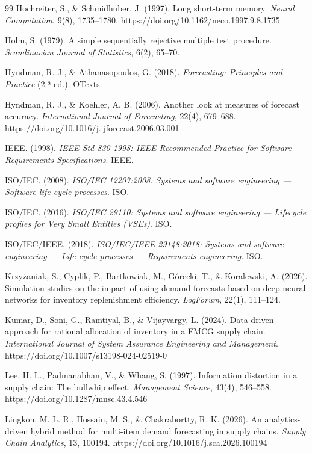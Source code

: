 \begin{thebibliography}{99}
 Hochreiter, S., \& Schmidhuber, J. (1997). Long short-term memory. \textit{Neural Computation}, 9(8), 1735--1780. https://doi.org/10.1162/neco.1997.9.8.1735

 Holm, S. (1979). A simple sequentially rejective multiple test procedure. \textit{Scandinavian Journal of Statistics}, 6(2), 65--70.

 Hyndman, R. J., \& Athanasopoulos, G. (2018). \textit{Forecasting: Principles and Practice} (2.ª ed.). OTexts.

 Hyndman, R. J., \& Koehler, A. B. (2006). Another look at measures of forecast accuracy. \textit{International Journal of Forecasting}, 22(4), 679--688. https://doi.org/10.1016/j.ijforecast.2006.03.001

 IEEE. (1998). \textit{IEEE Std 830-1998: IEEE Recommended Practice for Software Requirements Specifications}. IEEE.

 ISO/IEC. (2008). \textit{ISO/IEC 12207:2008: Systems and software engineering --- Software life cycle processes}. ISO.

 ISO/IEC. (2016). \textit{ISO/IEC 29110: Systems and software engineering --- Lifecycle profiles for Very Small Entities (VSEs)}. ISO.

 ISO/IEC/IEEE. (2018). \textit{ISO/IEC/IEEE 29148:2018: Systems and software engineering --- Life cycle processes --- Requirements engineering}. ISO.

 Krzyżaniak, S., Cyplik, P., Bartkowiak, M., Górecki, T., \& Koralewski, A. (2026). Simulation studies on the impact of using demand forecasts based on deep neural networks for inventory replenishment efficiency. \textit{LogForum}, 22(1), 111--124.

 Kumar, D., Soni, G., Ramtiyal, B., \& Vijayvargy, L. (2024). Data-driven approach for rational allocation of inventory in a FMCG supply chain. \textit{International Journal of System Assurance Engineering and Management}. https://doi.org/10.1007/s13198-024-02519-0

 Lee, H. L., Padmanabhan, V., \& Whang, S. (1997). Information distortion in a supply chain: The bullwhip effect. \textit{Management Science}, 43(4), 546--558. https://doi.org/10.1287/mnsc.43.4.546

 Lingkon, M. L. R., Hossain, M. S., \& Chakrabortty, R. K. (2026). An analytics-driven hybrid method for multi-item demand forecasting in supply chains. \textit{Supply Chain Analytics}, 13, 100194. https://doi.org/10.1016/j.sca.2026.100194


\end{thebibliography}
